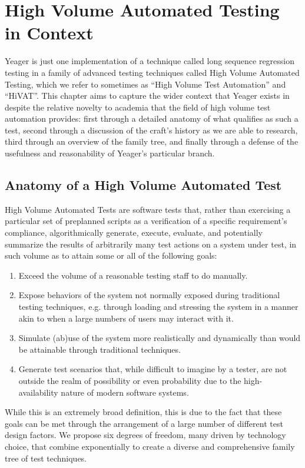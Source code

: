 \chapter{High Volume Automated Testing in Context}
Yeager is just one implementation of a technique called long sequence regression testing in a family of advanced testing techniques called High Volume Automated Testing, which we refer to sometimes as ``High Volume Test Automation'' and ``HiVAT''. This chapter aims to capture the wider context that Yeager exists in despite the relative novelty to academia that the field of high volume test automation provides: first through a detailed anatomy of what qualifies as such a test, second through a discussion of the craft's history as we are able to research, third through an overview of the family tree, and finally through a defense of the usefulness and reasonability of Yeager's particular branch.

\section{Anatomy of a High Volume Automated Test}
High Volume Automated Tests are software tests that, rather than exercising a particular set of preplanned scripts as a verification of a specific requirement's compliance, algorithmically generate, execute, evaluate, and potentially summarize the results of arbitrarily many test actions on a system under test, in such volume as to attain some or all of the following goals:
\begin{enumerate}
\item Exceed the volume of a reasonable testing staff to do manually.
\item Expose behaviors of the system not normally exposed during traditional testing techniques, e.g. through loading and stressing the system in a manner akin to when a large numbers of users may interact with it.
\item Simulate (ab)use of the system more realistically and dynamically than would be attainable through traditional techniques.
\item Generate test scenarios that, while difficult to imagine by a tester, are not outside the realm of possibility or even probability due to the high-availability nature of modern software systems.
\end{enumerate}

While this is an extremely broad definition, this is due to the fact that these goals can be met through the arrangement of a large number of different test design factors. We propose six degrees of freedom, many driven by technology choice, that combine exponentially to create a diverse and comprehensive family tree of test techniques.

